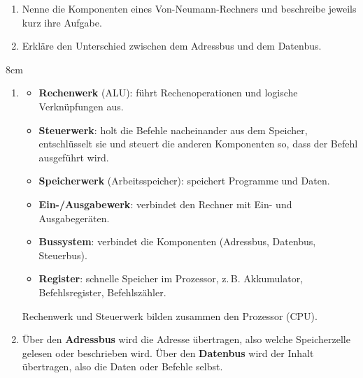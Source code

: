 \question[5]
\begin{enumerate}[label=\alph*)]
\item Nenne die Komponenten eines Von-Neumann-Rechners und beschreibe jeweils kurz ihre Aufgabe.
\item Erkläre den Unterschied zwischen dem Adressbus und dem Datenbus.
\end{enumerate}

\begin{solutionbox}{8cm}
\begin{enumerate}[label=\alph*)]
\item
\begin{itemize}
\item \textbf{Rechenwerk} (ALU): führt Rechenoperationen und logische Verknüpfungen aus.
\item \textbf{Steuerwerk}: holt die Befehle nacheinander aus dem Speicher, entschlüsselt sie
und steuert die anderen Komponenten so, dass der Befehl ausgeführt wird.
\item \textbf{Speicherwerk} (Arbeitsspeicher): speichert Programme und Daten.
\item \textbf{Ein-/Ausgabewerk}: verbindet den Rechner mit Ein- und Ausgabegeräten.
\item \textbf{Bussystem}: verbindet die Komponenten (Adressbus, Datenbus, Steuerbus).
\item \textbf{Register}: schnelle Speicher im Prozessor, z.\,B. Akkumulator, Befehlsregister, Befehlszähler.
\end{itemize}
Rechenwerk und Steuerwerk bilden zusammen den Prozessor (CPU).
\item Über den \textbf{Adressbus} wird die Adresse übertragen, also welche Speicherzelle gelesen
oder beschrieben wird. Über den \textbf{Datenbus} wird der Inhalt übertragen, also die Daten
oder Befehle selbst.
\end{enumerate}
\end{solutionbox}
